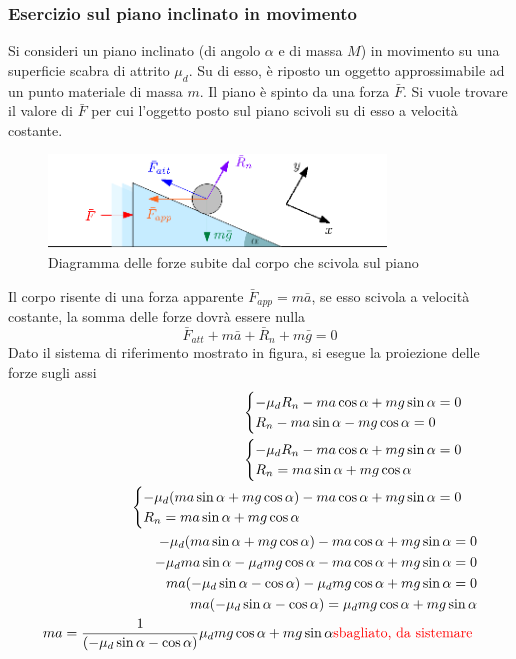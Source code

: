 \documentclass[10pt, letterpaper]{report}
\begin{document}
\subsubsection{Esercizio sul piano inclinato in movimento}
Si consideri un piano inclinato (di angolo $\alpha$ e di massa $M$) in movimento  su una superficie scabra di attrito $\mu_d$.
Su di esso, è riposto un oggetto approssimabile ad un punto materiale di massa $m$. Il piano è spinto da una 
forza $\bar F$. Si vuole trovare il valore di $\bar F$ per cui l'oggetto posto sul piano scivoli su di esso a velocità 
costante.\begin{figure}[h!]
    \centering
    \includegraphics[width=0.8\textwidth]{images/pianiInMovimento.eps}
    \caption{Diagramma delle forze subite dal corpo che scivola sul piano}
\end{figure}
Il corpo risente di una forza apparente $\bar F_{app}=m\bar a$, se esso scivola a velocità costante, la somma delle forze dovrà 
essere nulla 
$$ \bar F_{att}+m\bar a+\bar R_n+m\bar g=0$$
Dato il sistema di riferimento mostrato in figura, si esegue la proiezione delle forze sugli assi 
\begin{eqnarray} \begin{cases}
    -\mu_dR_n-ma\cos\alpha+mg\sin\alpha=0 \\ 
    R_n-ma\sin\alpha-mg\cos\alpha=0
\end{cases}\\
\begin{cases}
    -\mu_dR_n-ma\cos\alpha+mg\sin\alpha=0 \\ 
    R_n=ma\sin\alpha+mg\cos\alpha
\end{cases}\\
\begin{cases}
    -\mu_d(ma\sin\alpha+mg\cos\alpha)-ma\cos\alpha+mg\sin\alpha=0 \\ 
    R_n=ma\sin\alpha+mg\cos\alpha
\end{cases}\\ 
-\mu_d(ma\sin\alpha+mg\cos\alpha)-ma\cos\alpha+mg\sin\alpha=0\\ 
-\mu_dma\sin\alpha-\mu_dmg\cos\alpha-ma\cos\alpha+mg\sin\alpha=0\\
ma(-\mu_d\sin\alpha-\cos\alpha)-\mu_dmg\cos\alpha+mg\sin\alpha=0\\
ma(-\mu_d\sin\alpha-\cos\alpha)=\mu_dmg\cos\alpha+mg\sin\alpha\\ 
ma=\frac{1}{(-\mu_d\sin\alpha-\cos\alpha)}\mu_dmg\cos\alpha+mg\sin\alpha\text{\color{red} sbagliato, da sistemare \color{black}}
\end{eqnarray}
\end{document}
